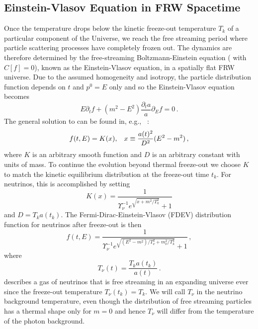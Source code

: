 \subsection{Einstein-Vlasov Equation in FRW Spacetime}\label{sec:free_stream_sol}
Once the temperature drops below the kinetic freeze-out temperature $T_k$ of a particular component of the Universe, we reach  the free streaming period where  particle scattering processes have completely frozen out. The   dynamics are therefore determined by the free-streaming Boltzmann-Einstein equation ( with $C[f]=0$), known as the Einstein-Vlasov equation, in a spatially flat FRW universe.  Due to the assumed homogeneity and isotropy, the particle distribution function depends on $t$ and $p^0=E$ only and so the Einstein-Vlasov equation becomes
\begin{equation}\label{VEeqFLR}
E\partial_tf+(m^2-E^2)\frac{\partial_ta}{a}\partial_{E}f=0\,.
\end{equation}
The general solution to  can be found in, e.g., ~\cite{Choquet-Bruhat:2009xil,Wong:2011ip}:
\begin{equation}\label{general_sol}
f(t,E)=K(x),\hspace{3mm} x\equiv\frac{a(t)^2}{D^2}(E^2-m^2)\,,
\end{equation}
where $K$ is an arbitrary smooth function and $D$ is an arbitrary constant with units of mass.  To continue the evolution beyond thermal freeze-out  we choose $K$ to match the kinetic equilibrium distribution  at the freeze-out time $t_k$. For neutrinos, this is accomplished by setting
\begin{equation}\label{K_func}
K(x)=\frac{1}{\Upsilon_\nu^{-1}e^{\sqrt{x+m^2/T_k^2}}+ 1}
\end{equation}
and $D=T_k a(t_k)$. The Fermi-Dirac-Einstein-Vlasov (FDEV) distribution function for neutrinos after freeze-out is then
\begin{equation}\label{neutrino_dist}
f(t,E)=\frac{1}{\Upsilon_\nu^{-1}e^{\sqrt{(E^2-m^2)/T_\nu^2+m_\nu^2 /T_k^2}}+ 1}\,,
\end{equation}
where 
\begin{equation}\label{Tneutrino_dist}
T_\nu(t)=\frac{T_ka(t_k)}{a(t)}\,.  
\end{equation}
 describes a gas of neutrinos that is free streaming in an expanding universe ever since the freeze-out temperature $T_\nu(t_k)=T_k$. We will call $T_\nu$ in  the neutrino background temperature, even though  the distribution of free streaming particles has a thermal shape only for $m=0$ and hence $T_{\nu}$ will differ from the temperature of the photon background.   

